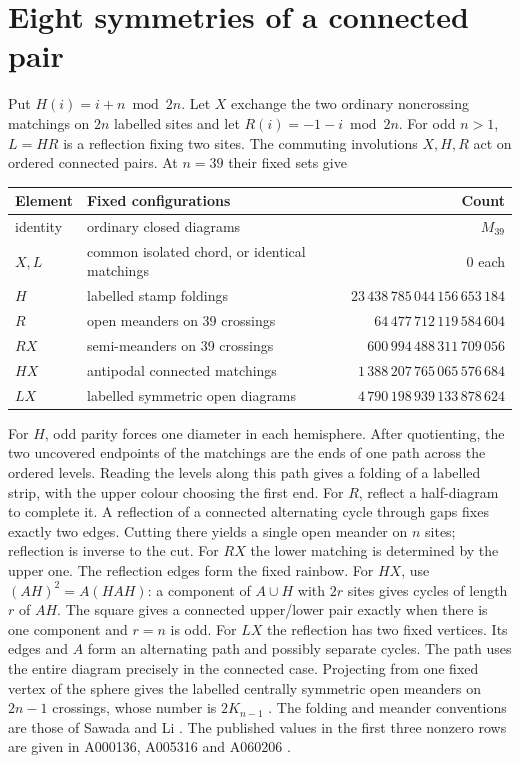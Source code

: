 \section{Eight symmetries of a connected pair}
Put \(H(i)=i+n\bmod 2n\). Let \(X\) exchange the two ordinary noncrossing matchings on \(2n\) labelled sites and let \(R(i)=-1-i\bmod 2n\). For odd \(n>1\), \(L=HR\) is a reflection fixing two sites. The commuting involutions \(X,H,R\) act on ordered connected pairs. At \(n=39\) their fixed sets give
\begin{center}\small
\begin{tabular}{llr}\toprule
Element & Fixed configurations & Count\\\midrule
identity & ordinary closed diagrams & \(M_{39}\)\\
\(X,L\) & common isolated chord, or identical matchings & 0 each\\
\(H\) & labelled stamp foldings & \(23\,438\,785\,044\,156\,653\,184\)\\
\(R\) & open meanders on 39 crossings & \(64\,477\,712\,119\,584\,604\)\\
\(RX\) & semi-meanders on 39 crossings & \(600\,994\,488\,311\,709\,056\)\\
\(HX\) & antipodal connected matchings & \(1\,388\,207\,765\,065\,576\,684\)\\
\(LX\) & labelled symmetric open diagrams & \(4\,790\,198\,939\,133\,878\,624\)\\
\bottomrule\end{tabular}
\end{center}
For \(H\), odd parity forces one diameter in each hemisphere. After quotienting, the two uncovered endpoints of the matchings are the ends of one path across the ordered levels. Reading the levels along this path gives a folding of a labelled strip, with the upper colour choosing the first end. For \(R\), reflect a half-diagram to complete it. A reflection of a connected alternating cycle through gaps fixes exactly two edges. Cutting there yields a single open meander on \(n\) sites; reflection is inverse to the cut. For \(RX\) the lower matching is determined by the upper one. The reflection edges form the fixed rainbow. For \(HX\), use \((AH)^2=A(HAH)\): a component of \(A\cup H\) with \(2r\) sites gives cycles of length \(r\) of \(AH\). The square gives a connected upper/lower pair exactly when there is one component and \(r=n\) is odd. For \(LX\) the reflection has two fixed vertices. Its edges and \(A\) form an alternating path and possibly separate cycles. The path uses the entire diagram precisely in the connected case. Projecting from one fixed vertex of the sphere gives the labelled centrally symmetric open meanders on \(2n-1\) crossings, whose number is \(2K_{n-1}\) \cite[Prop.~6.1]{legendre}. The folding and meander conventions are those of Sawada and Li \cite{folding}. The published values in the first three nonzero rows are given in A000136, A005316 and A060206 \cite{tables,hogan}.

